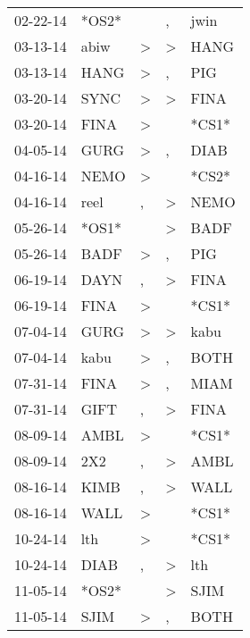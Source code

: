 \begin{supertabular}{lllll}
 02-22-14 &  *OS2* &                  &                , &   jwin \\
 03-13-14 &   abiw &     \textgreater &     \textgreater &   HANG \\
 03-13-14 &   HANG &     \textgreater &                , &    PIG \\
 03-20-14 &   SYNC &     \textgreater &     \textgreater &   FINA \\
 03-20-14 &   FINA &     \textgreater &                  &  *CS1* \\
 04-05-14 &   GURG &     \textgreater &                , &   DIAB \\
 04-16-14 &   NEMO &     \textgreater &                  &  *CS2* \\
 04-16-14 &   reel &                , &     \textgreater &   NEMO \\
 05-26-14 &  *OS1* &                  &     \textgreater &   BADF \\
 05-26-14 &   BADF &     \textgreater &                , &    PIG \\
 06-19-14 &   DAYN &                , &     \textgreater &   FINA \\
 06-19-14 &   FINA &     \textgreater &                  &  *CS1* \\
 07-04-14 &   GURG &     \textgreater &     \textgreater &   kabu \\
 07-04-14 &   kabu &     \textgreater &                , &   BOTH \\
 07-31-14 &   FINA &     \textgreater &                , &   MIAM \\
 07-31-14 &   GIFT &                , &     \textgreater &   FINA \\
 08-09-14 &   AMBL &     \textgreater &                  &  *CS1* \\
 08-09-14 &    2X2 &                , &     \textgreater &   AMBL \\
 08-16-14 &   KIMB &                , &     \textgreater &   WALL \\
 08-16-14 &   WALL &     \textgreater &                  &  *CS1* \\
 10-24-14 &    lth &     \textgreater &                  &  *CS1* \\
 10-24-14 &   DIAB &                , &     \textgreater &    lth \\
 11-05-14 &  *OS2* &                  &     \textgreater &   SJIM \\
 11-05-14 &   SJIM &     \textgreater &                , &   BOTH \\

\end{supertabular}

